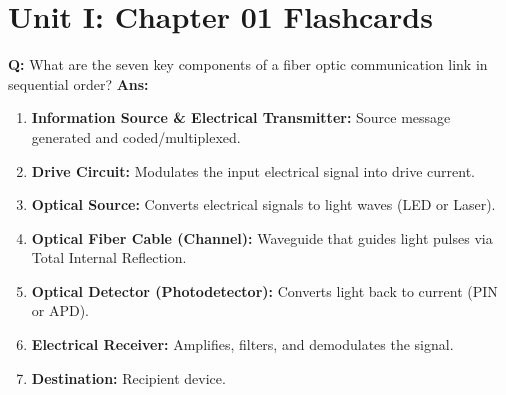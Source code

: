 \documentclass[10pt,a4paper,twocolumn]{article}
\begin{document}

\section*{Unit I: Chapter 01 Flashcards}

\begin{tcolorbox}[
  colback=white,
  colframe=UnitColorOne,
  colbacktitle=gray!10!white,
  coltitle=black,
  fonttitle=\bfseries\sffamily\small,
  title={Unit I $\bullet$ Card 1: Fiber Optic Communication System Blocks},
  boxrule=1.2pt,
  arc=2mm,
  outer arc=2mm,
  boxsep=1.5mm,
  top=1mm,
  bottom=1mm,
  left=1.5mm,
  right=1.5mm,
  before skip=2.5mm,
  after skip=2.5mm
]
\textbf{Q:} What are the seven key components of a fiber optic communication link in sequential order?
\tcbline
\textbf{Ans:} \begin{enumerate}
  \item \textbf{Information Source \& Electrical Transmitter:} Source message generated and coded/multiplexed.
  \item \textbf{Drive Circuit:} Modulates the input electrical signal into drive current.
  \item \textbf{Optical Source:} Converts electrical signals to light waves (LED or Laser).
  \item \textbf{Optical Fiber Cable (Channel):} Waveguide that guides light pulses via Total Internal Reflection.
  \item \textbf{Optical Detector (Photodetector):} Converts light back to current (PIN or APD).
  \item \textbf{Electrical Receiver:} Amplifies, filters, and demodulates the signal.
  \item \textbf{Destination:} Recipient device.
\end{enumerate}
\end{tcolorbox}
\end{document}

